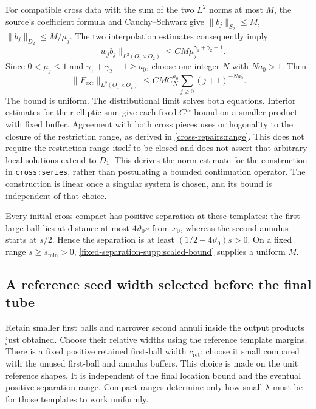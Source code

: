 \documentclass[11pt]{article}
\theoremstyle{definition}
\theoremstyle{remark}
\numberwithin{equation}{section}
\begin{document}
For compatible cross data with the sum of the two $L^2$ norms at most
$M$, the source's coefficient formula and Cauchy--Schwarz give
$\|b_j\|_{S_2}\le M$, $\|b_j\|_{D_2}\le M/\mu_j$.
The two interpolation estimates consequently imply
\[
 \|w_jb_j\|_{L^2(O_1\times O_2)}
 \le C M\mu_j^{\gamma_1+\gamma_2-1}.
\]
Since $0<\mu_j\le1$ and $\gamma_1+\gamma_2-1\ge a_0$, choose
one integer $N$ with $Na_0>1$. Then
\begin{equation}\label{fixed-separation-supp:series-bound}
 \|F_{\mathrm{ext}}\|_{L^2(O_1\times O_2)}
 \le C M C_N^{a_0}\sum_{j\ge0}(j+1)^{-Na_0}.
\end{equation}
The bound is uniform. The distributional limit solves both equations.
Interior estimates for their elliptic sum give each fixed $C^m$ bound
on a smaller product with fixed buffer. Agreement with both cross
pieces uses orthogonality to the closure of the restriction range,
as derived in \ref{cross-repairs:range}. This does not require the
restriction range itself to be closed and does not assert that arbitrary
local solutions extend to $D_1$.
This derives the norm estimate for the construction in
\texttt{cross:series}, rather than postulating a bounded continuation
operator. The construction is linear once a singular system is chosen,
and its bound is independent of that choice.

Every initial cross compact has positive separation at these templates:
the first large ball lies at distance at most $4\vartheta_0s$ from $x_0$,
whereas the second annulus starts at $s/2$. Hence the separation is at
least $(1/2-4\vartheta_0)s>0$. On a fixed range $s\ge s_{\min}>0$,
\eqref{fixed-separation-supp:scaled-bound} supplies a uniform $M$.

\subsection{A reference seed width selected before the final tube}
\label{fixed-separation-supp:seed}

Retain smaller first balls and narrower second annuli inside the output
products just obtained. Choose their relative widths using the reference
template margins. There is a fixed positive retained first-ball width
$c_{\mathrm{ret}}$; choose it small compared with the unused first-ball
and annulus buffers. This choice is made on the unit reference shapes.
It is independent of the final location bound and the eventual positive
separation range. Compact ranges determine only how small $\lambda$
must be for those templates to work uniformly.
\end{document}
